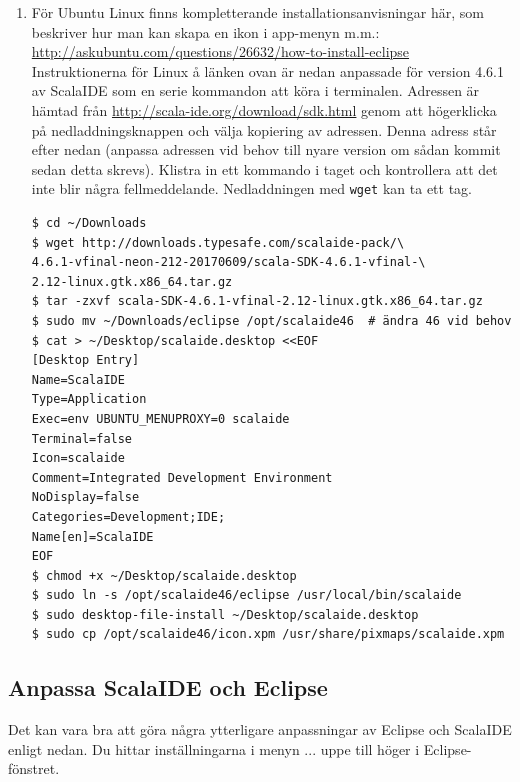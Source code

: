 \begin{enumerate}
\item För Ubuntu Linux finns kompletterande installationsanvisningar här, som beskriver hur man kan skapa en ikon i app-menyn m.m.:
\\ \url{http://askubuntu.com/questions/26632/how-to-install-eclipse}
\\ Instruktionerna för Linux å länken ovan är nedan anpassade för version 4.6.1 av ScalaIDE som en serie kommandon att köra i terminalen. Adressen är hämtad från \url{http://scala-ide.org/download/sdk.html} genom att högerklicka på nedladdningsknappen och välja kopiering av adressen. Denna adress står efter  nedan (anpassa adressen vid behov till nyare version om sådan kommit sedan detta skrevs). Klistra in ett kommando i taget och kontrollera att det inte blir några fellmeddelande. Nedladdningen med \texttt{wget} kan ta ett tag.
\begin{verbatim}
$ cd ~/Downloads
$ wget http://downloads.typesafe.com/scalaide-pack/\
4.6.1-vfinal-neon-212-20170609/scala-SDK-4.6.1-vfinal-\
2.12-linux.gtk.x86_64.tar.gz
$ tar -zxvf scala-SDK-4.6.1-vfinal-2.12-linux.gtk.x86_64.tar.gz
$ sudo mv ~/Downloads/eclipse /opt/scalaide46  # ändra 46 vid behov
$ cat > ~/Desktop/scalaide.desktop <<EOF
[Desktop Entry]
Name=ScalaIDE
Type=Application
Exec=env UBUNTU_MENUPROXY=0 scalaide
Terminal=false
Icon=scalaide
Comment=Integrated Development Environment
NoDisplay=false
Categories=Development;IDE;
Name[en]=ScalaIDE
EOF
$ chmod +x ~/Desktop/scalaide.desktop
$ sudo ln -s /opt/scalaide46/eclipse /usr/local/bin/scalaide
$ sudo desktop-file-install ~/Desktop/scalaide.desktop
$ sudo cp /opt/scalaide46/icon.xpm /usr/share/pixmaps/scalaide.xpm
\end{verbatim}
\end{enumerate}



\subsection{Anpassa ScalaIDE och Eclipse}\label{subsection:appendix:ide:eclipse:tweaks}

\newcommand\EclipsePrefs{\MenuArrow{Window}\MenuArrow{Preferences}}
\newcommand\EclipsePrefsGeneral{\EclipsePrefs\MenuArrow{General}}


Det kan vara bra att göra några ytterligare anpassningar av Eclipse och ScalaIDE enligt nedan. Du hittar inställningarna i menyn \EclipsePrefs ... uppe till höger i Eclipse-fönstret.

